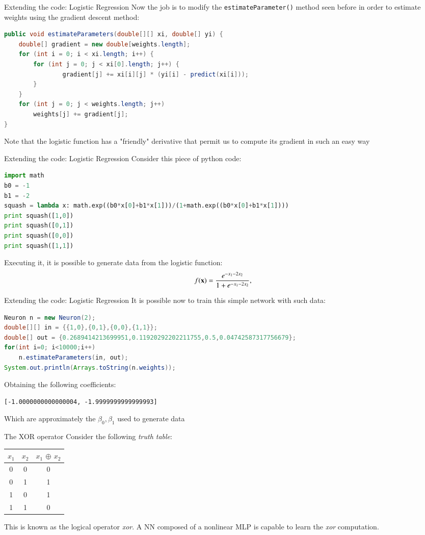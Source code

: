 \documentclass[xcolor ={table,usenames,dvipsnames}]{beamer}
\theoremstyle{definition}
\begin{document}
\begin{frame}[fragile]{Extending the code: Logistic Regression}
Now the job is to modify the \texttt{estimateParameter()} method seen before in order to estimate weights using the gradient descent method:
\begin{lstlisting}[language=Java]
public void estimateParameters(double[][] xi, double[] yi) {
	double[] gradient = new double[weights.length];
	for (int i = 0; i < xi.length; i++) {
		for (int j = 0; j < xi[0].length; j++) {
				gradient[j] += xi[i][j] * (yi[i] - predict(xi[i]));
		}
	}
	for (int j = 0; j < weights.length; j++)
		weights[j] += gradient[j];
}
\end{lstlisting}
Note that the logistic function has a "friendly" derivative that permit us to compute its gradient in such an easy way
\end{frame}
\begin{frame}[fragile]{Extending the code: Logistic Regression}
Consider this piece of python code:
\begin{lstlisting}[language=Python]
import math
b0 = -1
b1 = -2
squash = lambda x: math.exp((b0*x[0]+b1*x[1]))/(1+math.exp((b0*x[0]+b1*x[1])))
print squash([1,0])
print squash([0,1])
print squash([0,0])
print squash([1,1])
\end{lstlisting}
Executing it, it is possible to generate data from the logistic function:
$$
f(\textbf x) = \frac{e^{-x_1-2x_2}}{1+e^{-x_1-2x_2}},
$$
\end{frame}
\begin{frame}[fragile]{Extending the code: Logistic Regression}
It is possible now to train this simple network with such data:
\begin{lstlisting}[language=Java]
Neuron n = new Neuron(2);
double[][] in = {{1,0},{0,1},{0,0},{1,1}};
double[] out = {0.2689414213699951,0.11920292202211755,0.5,0.04742587317756679};
for(int i=0; i<10000;i++)
	n.estimateParameters(in, out);
System.out.println(Arrays.toString(n.weights));
\end{lstlisting}
Obtaining the following coefficients:
\begin{lstlisting}
[-1.0000000000000004, -1.9999999999999993]
\end{lstlisting}
Which are approximately the $\beta_0,\beta_1$ used to generate data
\end{frame}
\begin{frame}{The XOR operator}
Consider the following \emph{truth table}:
\begin{center}
	\begin{tabular}{|c|c|c|}
		\hline 
		$x_1$ & $x_2$ & $x_1$ $\oplus$ $x_2$ \\ 
		\hline 
		0 & 0 & 0 \\ 
		\hline 
		0 & 1 & 1 \\ 
		\hline 
		1 & 0 & 1 \\ 
		\hline 
		1 & 1 & 0 \\ 
		\hline 
	\end{tabular}
\end{center} 
This is known as the logical operator \textit{xor}. A NN composed of a nonlinear MLP is capable to learn the \textit{xor} computation.
\end{frame}
\end{document}
